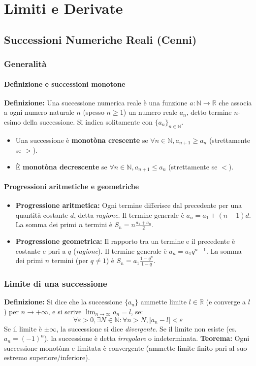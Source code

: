 \chapter{Limiti e Derivate}

\section{Successioni Numeriche Reali (Cenni)}
\subsection{Generalità}
\subsubsection{Definizione e successioni monotone}
\textbf{Definizione:} Una successione numerica reale è una funzione $a: \mathbb{N} \to \mathbb{R}$ che associa a ogni numero naturale $n$ (spesso $n \ge 1$) un numero reale $a_n$, detto termine $n$-esimo della successione. Si indica solitamente con $\{a_n\}_{n \in \mathbb{N}}$.
\begin{itemize}
    \item Una successione è \textbf{monotòna crescente} se $\forall n \in \mathbb{N}, a_{n+1} \ge a_n$ (strettamente se $>$).
    \item È \textbf{monotòna decrescente} se $\forall n \in \mathbb{N}, a_{n+1} \le a_n$ (strettamente se $<$).
\end{itemize}

\subsubsection{Progressioni aritmetiche e geometriche}
\begin{itemize}
    \item \textbf{Progressione aritmetica:} Ogni termine differisce dal precedente per una quantità costante $d$, detta \textit{ragione}. Il termine generale è $a_n = a_1 + (n-1)d$. La somma dei primi $n$ termini è $S_n = n \frac{a_1 + a_n}{2}$.
    \item \textbf{Progressione geometrica:} Il rapporto tra un termine e il precedente è costante e pari a $q$ (\textit{ragione}). Il termine generale è $a_n = a_1 q^{n-1}$. La somma dei primi $n$ termini (per $q \neq 1$) è $S_n = a_1 \frac{1 - q^n}{1 - q}$.
\end{itemize}

\subsection{Limite di una successione}
\textbf{Definizione:} Si dice che la successione $\{a_n\}$ ammette limite $l \in \mathbb{R}$ (e converge a $l$) per $n \to +\infty$, e si scrive $\lim_{n \to \infty} a_n = l$, se:
\[ \forall \varepsilon > 0, \exists N \in \mathbb{N} : \forall n > N, |a_n - l| < \varepsilon \]
Se il limite è $\pm \infty$, la successione si dice \textit{divergente}. Se il limite non esiste (es. $a_n = (-1)^n$), la successione è detta \textit{irregolare} o indeterminata.
\textbf{Teorema:} Ogni successione monotòna e limitata è convergente (ammette limite finito pari al suo estremo superiore/inferiore).

